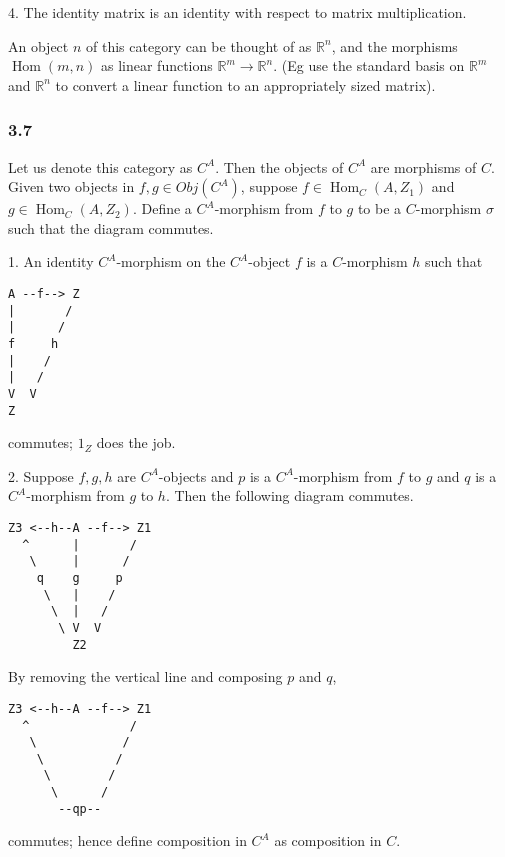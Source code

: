 \documentclass{article}
\DeclareMathOperator{\Hom}{Hom}
\def\R{\mathbb{R}}
\begin{document}
4. The identity matrix is an identity with respect to matrix multiplication.

An object $n$ of this category can be thought of as $\R^n$, and the morphisms $\Hom(m, n)$ as linear functions $\R^m \to \R^n$. (Eg use the standard basis on $\R^m$ and $\R^n$ to convert a linear function to an appropriately sized matrix).

\subsubsection*{3.7}

Let us denote this category as $C^A$. Then the objects of $C^A$ are morphisms of $C$. Given two objects in $f, g \in Obj(C^A)$, suppose $f \in \Hom_C(A, Z_1)$ and $g \in \Hom_C(A, Z_2)$. Define a $C^A$-morphism from $f$ to $g$ to be a $C$-morphism $\sigma$ such that the diagram commutes.


1. An identity $C^A$-morphism on the $C^A$-object $f$ is a $C$-morphism $h$ such that

\begin{verbatim}
A --f--> Z
|       /
|      /
f     h
|    /
|   /
V  V
Z
\end{verbatim}

commutes; $1_Z$ does the job.

2. Suppose $f, g, h$ are $C^A$-objects and $p$ is a $C^A$-morphism from $f$ to $g$ and $q$ is a $C^A$-morphism from $g$ to $h$. Then the following diagram commutes.

\begin{verbatim}
Z3 <--h--A --f--> Z1
  ^      |       /
   \     |      /
    q    g     p
     \   |    /
      \  |   /
       \ V  V
         Z2
\end{verbatim}

By removing the vertical line and composing $p$ and $q$,

\begin{verbatim}
Z3 <--h--A --f--> Z1
  ^              /
   \            /
    \          /
     \        /
      \      /
       --qp--
\end{verbatim}

commutes; hence define composition in $C^A$ as composition in $C$.
\end{document}
